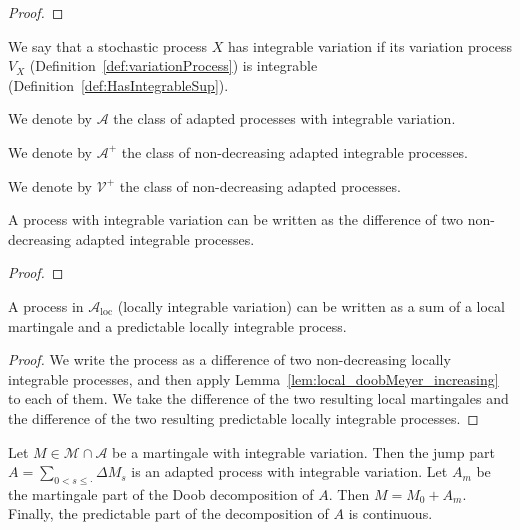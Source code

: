 \begin{proof}

\end{proof}


\begin{definition}\label{def:HasIntegrableVariation}
We say that a stochastic process $X$ has integrable variation if its variation process $V_X$ (Definition~\ref{def:variationProcess}) is integrable (Definition~\ref{def:HasIntegrableSup}).

We denote by $\mathcal{A}$ the class of adapted processes with integrable variation.
\end{definition}

We denote by $\mathcal{A}^+$ the class of non-decreasing adapted integrable processes.

We denote by $\mathcal{V}^+$ the class of non-decreasing adapted processes.


\begin{lemma}\label{lem:HasIntegrableVariation.eq_sub_monotone}
A process with integrable variation can be written as the difference of two non-decreasing adapted integrable processes.
\end{lemma}

\begin{proof}

\end{proof}


\begin{lemma}\label{lem:local_doobMeyer_integrable_variation}
A process in $\mathcal{A}_{\mathrm{loc}}$ (locally integrable variation) can be written as a sum of a local martingale and a predictable locally integrable process.
\end{lemma}

\begin{proof}
We write the process as a difference of two non-decreasing locally integrable processes, and then apply Lemma~\ref{lem:local_doobMeyer_increasing} to each of them.
We take the difference of the two resulting local martingales and the difference of the two resulting predictable locally integrable processes.
\end{proof}


\begin{lemma}\label{lem:martingalePart_jumpPart}
Let $M \in \mathcal{M} \cap \mathcal{A}$ be a martingale with integrable variation. Then the jump part $A = \sum_{0 < s \le \cdot} \Delta M_s$ is an adapted process with integrable variation. Let $A_m$ be the martingale part of the Doob decomposition of $A$. Then $M = M_0 + A_m$. Finally, the predictable part of the decomposition of $A$ is continuous.
\end{lemma}

